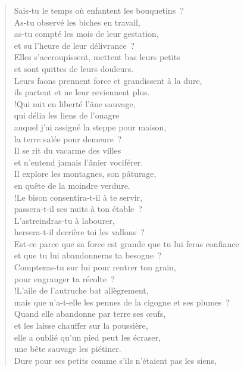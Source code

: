 \documentclass[french,twoside]{book} %
\begin{document}
\begin{verse}
Sais-tu le temps où enfantent les bouquetins ? \\
As-tu observé les biches en travail,\\
as-tu compté les mois de leur gestation, \\
et su l’heure de leur délivrance ?\\
Elles s’accroupissent, mettent bas leurs petits \\
et sont quittes de leurs douleurs.\\
Leurs faons prennent force et grandissent à la dure, \\
ils partent et ne leur reviennent plus.\\!Qui mit en liberté l’âne sauvage, \\
qui délia les liens de l’onagre\\
auquel j’ai assigné la steppe pour maison, \\
la terre salée pour demeure ?\\
Il se rit du vacarme des villes \\
et n’entend jamais l’ânier vociférer.\\
Il explore les montagnes, son pâturage, \\
en quête de la moindre verdure.\\!Le bison consentira-t-il à te servir, \\
passera-t-il ses nuits à ton étable ?\\
L’astreindras-tu à labourer, \\
hersera-t-il derrière toi les vallons ?\\
Est-ce parce que sa force est grande que tu lui feras confiance \\
et que tu lui abandonneras ta besogne ?\\
Compteras-tu sur lui pour rentrer ton grain, \\
pour engranger ta récolte ?\\!L’aile de l’autruche bat allègrement, \\
mais que n’a-t-elle les pennes de la cigogne et ses plumes ?\\
Quand elle abandonne par terre ses œufs, \\
et les laisse chauffer sur la poussière,\\
elle a oublié qu’un pied peut les écraser, \\
une bête sauvage les piétiner.\\
Dure pour ses petits comme s’ils n’étaient pas les siens, \\

\end{verse}
\end{document}

